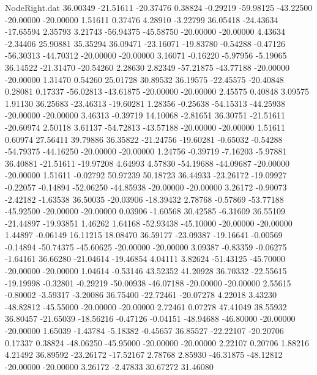 \begin{filecontents}{NodeRight.dat}
  36.00349  -21.51611  -20.37476     0.38824   -0.29219  -59.98125  -43.22500  -20.00000  -20.00000    1.51611    0.37476    4.28910   -3.22799
  36.05418  -24.43634  -17.65594     2.35793    3.21743  -56.94375  -45.58750  -20.00000  -20.00000    4.43634   -2.34406   25.90881   35.35294
  36.09471  -23.16071  -19.83780    -0.54288   -0.47126  -56.30313  -44.70312  -20.00000  -20.00000    3.16071   -0.16220   -5.97956   -5.19065
  36.14522  -21.31470  -20.54260     2.28630    2.82349  -57.21875  -43.77188  -20.00000  -20.00000    1.31470    0.54260   25.01728   30.89532
  36.19575  -22.45575  -20.40848     0.28081    0.17337  -56.02813  -43.61875  -20.00000  -20.00000    2.45575    0.40848    3.09575    1.91130
  36.25683  -23.46313  -19.60281     1.28356   -0.25638  -54.15313  -44.25938  -20.00000  -20.00000    3.46313   -0.39719   14.10068   -2.81651
  36.30751  -21.51611  -20.60974     2.50118    3.61137  -54.72813  -43.57188  -20.00000  -20.00000    1.51611    0.60974   27.56411   39.79886
  36.35822  -21.24756  -19.60281    -0.65032   -0.54288  -54.79375  -44.16250  -20.00000  -20.00000    1.24756   -0.39719   -7.16203   -5.97881
  36.40881  -21.51611  -19.97208     4.64993    4.57830  -54.19688  -44.09687  -20.00000  -20.00000    1.51611   -0.02792   50.97239   50.18723
  36.44933  -23.26172  -19.09927    -0.22057   -0.14894  -52.06250  -44.85938  -20.00000  -20.00000    3.26172   -0.90073   -2.42182   -1.63538
  36.50035  -20.03906  -18.39432     2.78768   -0.57869  -53.77188  -45.92500  -20.00000  -20.00000    0.03906   -1.60568   30.42585   -6.31609
  36.55109  -21.44897  -19.93851     1.46262    1.64168  -52.93438  -45.10000  -20.00000  -20.00000    1.44897   -0.06149   16.11215   18.08470
  36.59177  -23.09387  -19.16641    -0.00569   -0.14894  -50.74375  -45.60625  -20.00000  -20.00000    3.09387   -0.83359   -0.06275   -1.64161
  36.66280  -21.04614  -19.46854     4.04111    3.82624  -51.43125  -45.70000  -20.00000  -20.00000    1.04614   -0.53146   43.52352   41.20928
  36.70332  -22.55615  -19.19998    -0.32801   -0.29219  -50.00938  -46.07188  -20.00000  -20.00000    2.55615   -0.80002   -3.59317   -3.20086
  36.75400  -22.72461  -20.07278     4.22018    3.43230  -48.82812  -45.55000  -20.00000  -20.00000    2.72461    0.07278   47.41049   38.55932
  36.80457  -21.65039  -18.56216    -0.47126   -0.04151  -48.94688  -46.80000  -20.00000  -20.00000    1.65039   -1.43784   -5.18382   -0.45657
  36.85527  -22.22107  -20.20706     0.17337    0.38824  -48.06250  -45.95000  -20.00000  -20.00000    2.22107    0.20706    1.88216    4.21492
  36.89592  -23.26172  -17.52167     2.78768    2.85930  -46.31875  -48.12812  -20.00000  -20.00000    3.26172   -2.47833   30.67272   31.46080

\end{filecontents}
